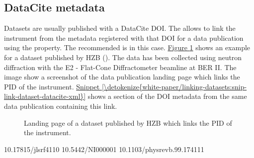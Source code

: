 \documentclass[a4paper,10pt,english]{sphinxmanual}
\begin{document}
\subsection{DataCite metadata}
\label{\detokenize{white-paper/linking-datasets:datacite-metadata}}
Datasets are usually published with a DataCite DOI.  The  allows to link the instrument from the metadata
registered with that DOI for a data publication using the
 property.  The recommended  is
 in this case.  \hyperref[\detokenize{white-paper/linking-datasets:fig-link-hzb}]{Figure \ref{\detokenize{white-paper/linking-datasets:fig-link-hzb}}} shows an example
for a dataset published by HZB ().
The data has been collected using neutron diffraction with the E2 -
Flat-Cone Diffractometer beamline at BER II.  The image show a
screenshot of the data publication landing page which links the PID of
the instrument.  \hyperref[\detokenize{white-paper/linking-datasets:snip-link-dataset-datacite-xml}]{Snippet \ref{\detokenize{white-paper/linking-datasets:snip-link-dataset-datacite-xml}}} shows a
section of the DOI metadata from the same data publication containing
this link.

\begin{figure}[htbp]
\centering
\capstart

\noindent{}
\caption{Landing page of a dataset published by HZB which links the PID of
the instrument.}\label{\detokenize{white-paper/linking-datasets:id4}}\label{\detokenize{white-paper/linking-datasets:fig-link-hzb}}\end{figure}
\def\sphinxLiteralBlockLabel{\label{\detokenize{white-paper/linking-datasets:id5}}\label{\detokenize{white-paper/linking-datasets:snip-link-dataset-datacite-xml}}}
\begin{sphinxVerbatim}[commandchars=\\\{\}]
      10.17815/jlsrf\PYGZhy{}4\PYGZhy{}110
      10.5442/NI000001
      10.1103/physrevb.99.174111
\end{sphinxVerbatim}
\end{document}
